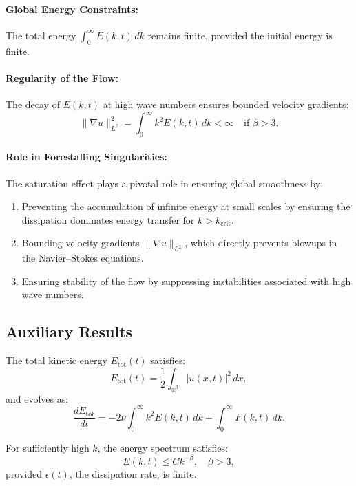 \paragraph{Global Energy Constraints:}
The total energy $\int_0^\infty E(k, t) \, dk$ remains finite, provided the initial energy is finite.

\paragraph{Regularity of the Flow:}
The decay of $E(k, t)$ at high wave numbers ensures bounded velocity gradients:
\[
\|\nabla u\|_{L^2}^2 = \int_0^\infty k^2 E(k, t) \, dk < \infty \quad \text{if } \beta > 3.
\]

\paragraph{Role in Forestalling Singularities:}
The saturation effect plays a pivotal role in ensuring global smoothness by:
\begin{enumerate}
    \item Preventing the accumulation of infinite energy at small scales by ensuring the dissipation dominates energy transfer for $k > k_{\text{crit}}$.
    \item Bounding velocity gradients $\|\nabla u\|_{L^2}$, which directly prevents blowups in the Navier--Stokes equations.
    \item Ensuring stability of the flow by suppressing instabilities associated with high wave numbers.
\end{enumerate}

\subsection{Auxiliary Results}

\begin{lemma}
The total kinetic energy $E_{\text{tot}}(t)$ satisfies:
\[
E_{\text{tot}}(t) = \frac{1}{2} \int_{\mathbb{R}^3} |u(x,t)|^2 \, dx,
\]
and evolves as:
\[
\frac{dE_{\text{tot}}}{dt} = -2\nu \int_0^\infty k^2 E(k,t) \, dk + \int_0^\infty F(k,t) \, dk.
\]
\end{lemma}

\begin{lemma}
For sufficiently high $k$, the energy spectrum satisfies:
\[
E(k, t) \leq C k^{-\beta}, \quad \beta > 3,
\]
provided $\epsilon(t)$, the dissipation rate, is finite.
\end{lemma}

